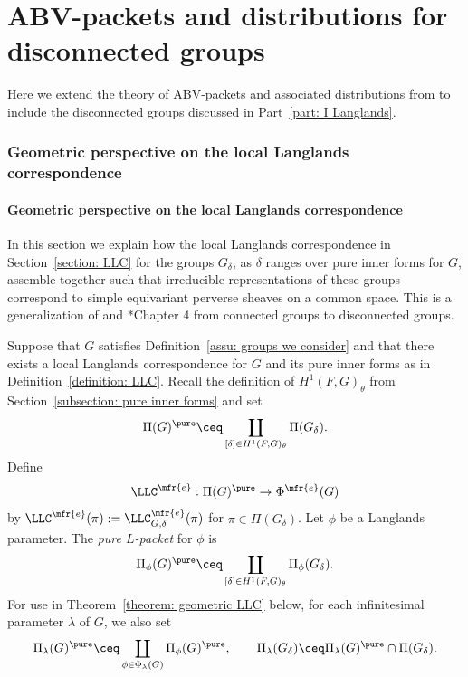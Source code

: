 \documentclass[11pt,letterpaper]{amsart}
\numberwithin{equation}{section}
\begin{document}
\part{ABV-packets and distributions for disconnected groups}\label{part: III ABV}


Here we extend the theory of ABV-packets and associated distributions from \cites{ABV92, Vog93, CFMMX22} to include the disconnected groups discussed in Part~\ref{part: I Langlands}.

          

\section{Geometric perspective on the local Langlands correspondence}\label{section: Vogan's LLC}



\subsection{Geometric perspective on the local Langlands correspondence}\label{subsection: Vogan's LLC}

In this section we explain how the local Langlands correspondence in Section~\ref{section: LLC} for the groups $G_\delta$, as $\delta$ ranges over pure inner forms for $G$, assemble together such that irreducible representations of these groups correspond to simple equivariant perverse sheaves on a common space. 
This is a generalization of \cite{Vog93} and \cite{CFMMX22}*{Chapter 4} from connected groups to disconnected groups.

\begin{definition}\label{definition: pure packet}
Suppose that $G$ satisfies Definition~\ref{assu: groups we consider} and that there exists a local Langlands correspondence for $G$ and its pure inner forms as in Definition~\ref{definition: LLC}.
Recall the definition of $H^1(F,G)_{\theta}$ from Section~\ref{subsection: pure inner forms} and set
\[
    \Pi(G)^\pure 
    \ceq
    \coprod_{[\delta]\in H^1(F,G)_{\theta}}
    \Pi(G_\delta).
\]
Define 
\[ \LLC^{\mfr{e}}: \Pi(G)^{\pure} \to \Phi^{\mfr{e}}(G)  \]
by $\LLC^{\mfr{e}}(\pi):= \LLC^{\mfr{e}}_{G,\delta}(\pi)$ for $\pi \in \Pi(G_{\delta})$.
Let $\phi$ be a Langlands parameter. The {\it pure $L$-packet} for $\phi$ is 
\[
    \Pi_\phi(G)^\pure 
    \ceq
    \coprod_{[\delta]\in H^1(F,G)_{\theta}}
    \Pi_{\phi}(G_\delta).
\]
For use in Theorem~\ref{theorem: geometric LLC} below, for each infinitesimal parameter $\lambda$ of $G$, we also set 
\[
\Pi_\lambda(G)^\pure 
\ceq
\coprod_{\phi \in \Phi_{\lambda}(G)} \Pi_{\phi}(G)^\pure, \qquad \Pi_\lambda(G_{\delta}) 
\ceq
\Pi_{\lambda}(G)^{\pure} \cap \Pi(G_{\delta}).
\]
\end{definition}
\end{document}
